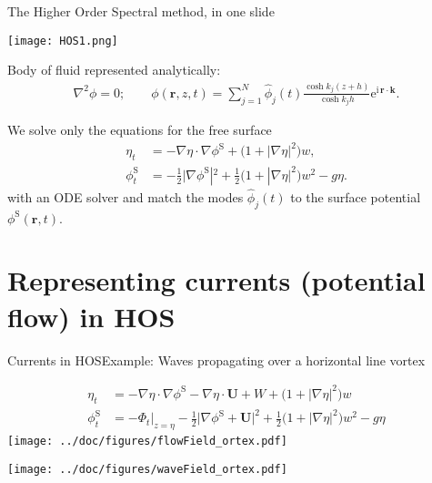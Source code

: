 \documentclass{sintefbeamer}
\newcommand{\mr}{\mathrm}
\renewcommand{\S}{^\mr{S}}
\newcommand{\ii}{\mr{i}\,}
\newcommand{\ee}{\mr{e}}
\renewcommand{\_}[1]{_\mr{#1}}
\newcommand{\w}{w}
\newcommand{\bU}{\bm U}
\begin{document}
\begin{frame}{The Higher Order Spectral method, in one slide}
\vspace{-1cm}
\begin{center}
\texttt{[image: HOS1.png]}
\end{center}

Body of fluid represented analytically:
\begin{align*}
\nabla^2\phi = 0;\qquad  \phi(\bm r,z,t) = \sum_{j=1}^N \hat\phi_j(t) \frac{\cosh k_j(z+h)}{\cosh k_j h} \ee^{\ii \bm r \cdot \bm k}.
\end{align*}

We solve only the equations for the free surface 
\begin{align*}
\eta_t &=   - \nabla\eta\cdot\nabla\phi\S     + \big(1+|\nabla\eta|^2\big)\w, %
\\
\phi\S_t &= - \frac12\big|\nabla\phi\S|^2 + \frac12\big(1+|\nabla\eta|^2\big)\w^2 - g\eta.
\end{align*}
with an ODE solver and match the modes $\hat\phi_j(t) $ to the surface potential $\phi\S(\bm r,t)$.
\end{frame}


\section{Representing currents (potential flow) in HOS}

\begin{frame}{Currents in HOS}{Example: Waves propagating over a horizontal line vortex}
\centering
\vspace{-.25cm}
\begin{minipage}{.5\framewidth}
\scriptsize
	\begin{align*}
\eta_t &=   - \nabla\eta\cdot\nabla\phi\S  - \nabla\eta\cdot\bU + W  + \big(1+|\nabla\eta|^2\big)\w
\\
\phi\S_t &= -\Phi_t\big|_{z=\eta} - \frac12\big|\nabla\phi\S +\bU\big|^2 + \frac12\big(1+|\nabla\eta|^2\big)\w^2 - g\eta
\end{align*}
\normalsize 
\texttt{[image: ../doc/figures/flowField\_vortex.pdf]}%
\end{minipage}%
\texttt{[image: ../doc/figures/waveField\_vortex.pdf]}%
\end{frame}
\end{document}
